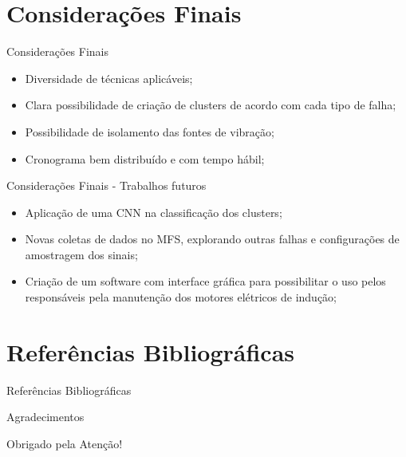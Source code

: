 \documentclass[aspectratio=169]{beamer}
\begin{document}

\section{Considerações Finais}
	\begin{frame}{Considerações Finais}
    \begin{itemize}
			\justifying
			\item Diversidade de técnicas aplicáveis;
			\item Clara possibilidade de criação de clusters de acordo com cada tipo de falha;
			\item Possibilidade de isolamento das fontes de vibração;
			\item Cronograma bem distribuído e com tempo hábil;
	\end{itemize}
\end{frame}


\begin{frame}{Considerações Finais - Trabalhos futuros}
    \begin{itemize}
        \justifying
		\item Aplicação de uma CNN na classificação dos clusters; 
		\item Novas coletas de dados no MFS, explorando outras falhas e configurações de amostragem dos sinais;
		\item Criação de um software com interface gráfica para possibilitar o uso pelos responsáveis pela manutenção
		dos motores elétricos de indução;
		\end{itemize}
\end{frame}


\section{Referências Bibliográficas}
\begin{frame}[allowframebreaks]{Referências Bibliográficas}
	
\end{frame}


\begin{frame}{Agradecimentos}
		\begin{center}
			{\Huge Obrigado pela Atenção!}
		\end{center}
\end{frame}
\end{document}
